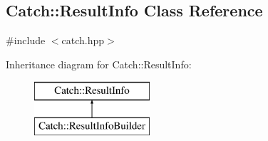 \hypertarget{classCatch_1_1ResultInfo}{\subsection{Catch\-:\-:Result\-Info Class Reference}
\label{classCatch_1_1ResultInfo}
}


{\ttfamily \#include $<$catch.\-hpp$>$}

Inheritance diagram for Catch\-:\-:Result\-Info\-:\begin{figure}[H]
\begin{center}
\leavevmode
\includegraphics[height=2.000000cm]{classCatch_1_1ResultInfo}
\end{center}
\end{figure}
